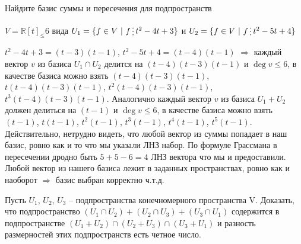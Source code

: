 \documentclass[12pt]{article}
\newenvironment{problem}[2][Problem]
{\begin{trivlist}\item[{\bfseries #1} {\bfseries #2.}]}{\end{trivlist}}
\newenvironment{solutions}[2][Solutions]
{\begin{trivlist}\item[{\bfseries #1} {\bfseries #2.}]}{\end{trivlist}}
\begin{document}
\begin{problem}{1} 
Найдите базис суммы и пересечения для подпространств 

$V = \mathds{R}[t]_\leqslant6$ вида $U_1 = \{ f \in V\ |\ f \mathop{\raisebox{-2pt}{\vdots}} t^2-4t+3\}$ и $U_2 = \{ f \in V\ |\ f \mathop{\raisebox{-2pt}{\vdots}} t^2-5t+4\}$
\end{problem}

\begin{solutions}{1} 
$t^2-4t+3 = (t-3)(t-1)$, $t^2-5t+4 = (t-4)(t-1)$ $\Rightarrow$ каждый вектор $v$ из базиса $U_1\cap U_2$ делится на $(t-4)(t-3)(t-1)$ и $\deg v \leqslant6$, в качестве базиса можно взять $(t-4)(t-3)(t-1)$, $t(t-4)(t-3)(t-1)$, $t^2(t-4)(t-3)(t-1)$, $t^3(t-4)(t-3)(t-1)$. Аналогично каждый вектор $v$ из базиса $U_1+U_2$ должен делиться на $(t-1)$ и $\deg v \leqslant6$, в качестве базиса можно взять $(t-1)$, $t(t-1)$, $t^2(t-1)$, $t^3(t-1)$, $t^4(t-1)$, $t^5(t-1)$. Действительно, нетрудно видеть, что любой вектор из суммы попадает в наш базис, ровно как и то что мы указали ЛНЗ набор. По формуле Грассмана в пересечении дродно быть $5+5-6 = 4$ ЛНЗ вектора что мы и предоставили. Любой вектор из нашего базиса лежит в заданных пространствах, ровно как и наоборот $\Rightarrow$ базис выбран корректно ч.т.д.
\end{solutions}

\begin{problem}{2} 
Пусть $U_1$, $U_2$, $U_3$ – подпространства конечномерного пространства V. Доказать, что подпространство $(U_1\cap U_2)+(U_2\cap U_3)+(U_3\cap U_1)$ содержится в подпространстве $(U_1+U_2)\cap(U_2+U_3)\cap(U_3+U_1)$ и разность размерностей
этих подпространств есть четное число.
\end{problem}
\end{document}
